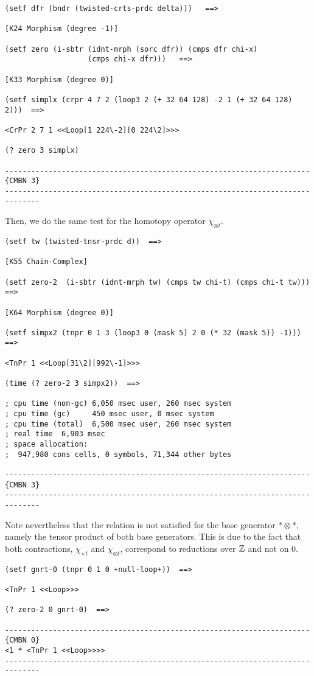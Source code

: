 {\footnotesize\begin{verbatim}
(setf dfr (bndr (twisted-crts-prdc delta)))   ==>

[K24 Morphism (degree -1)]

(setf zero (i-sbtr (idnt-mrph (sorc dfr)) (cmps dfr chi-x) 
                   (cmps chi-x dfr)))   ==>

[K33 Morphism (degree 0)]

(setf simplx (crpr 4 7 2 (loop3 2 (+ 32 64 128) -2 1 (+ 32 64 128) 2)))  ==>

<CrPr 2 7 1 <<Loop[1 224\-2][0 224\2]>>>

(? zero 3 simplx)

----------------------------------------------------------------------{CMBN 3}
------------------------------------------------------------------------------
\end{verbatim}}
Then, we do the same test for the homotopy operator $\chi_{\otimes t}$. 
{\footnotesize\begin{verbatim}
(setf tw (twisted-tnsr-prdc d))  ==>

[K55 Chain-Complex]

(setf zero-2  (i-sbtr (idnt-mrph tw) (cmps tw chi-t) (cmps chi-t tw)))  ==>

[K64 Morphism (degree 0)]

(setf simpx2 (tnpr 0 1 3 (loop3 0 (mask 5) 2 0 (* 32 (mask 5)) -1)))  ==>

<TnPr 1 <<Loop[31\2][992\-1]>>>

(time (? zero-2 3 simpx2))  ==>

; cpu time (non-gc) 6,050 msec user, 260 msec system
; cpu time (gc)     450 msec user, 0 msec system
; cpu time (total)  6,500 msec user, 260 msec system
; real time  6,903 msec
; space allocation:
;  947,980 cons cells, 0 symbols, 71,344 other bytes

----------------------------------------------------------------------{CMBN 3}
------------------------------------------------------------------------------
\end{verbatim}}
Note nevertheless that the relation is not satisfied for the base generator
$*\otimes *$, namely the tensor product of both base generators.
This is due to the fact that both contractions,  $\chi_{\times t}$ and  $\chi_{\otimes t}$,
correspond to  reductions over  ${{\Bbb Z}}$ and not on $0$.
{\footnotesize\begin{verbatim}
(setf gnrt-0 (tnpr 0 1 0 +null-loop+))  ==>

<TnPr 1 <<Loop>>>

(? zero-2 0 gnrt-0)  ==>

----------------------------------------------------------------------{CMBN 0}
<1 * <TnPr 1 <<Loop>>>>
------------------------------------------------------------------------------
\end{verbatim}}
